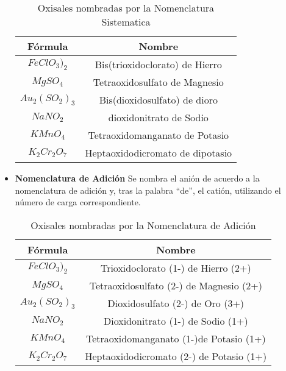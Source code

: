 \begin{itemize}
	\begin{table}[h!]
		\centering
		\begin{tabular}{c|c}
			Fórmula&Nombre \\ \hline
			$FeClO_3)_2$&Bis(trioxidoclorato) de Hierro\\
			$MgSO_4$&Tetraoxidosulfato de Magnesio\\
			$Au_2(SO_2)_3$&Bis(dioxidosulfato) de dioro\\
			$NaNO_2$&dioxidonitrato de Sodio\\
			$KMnO_4$&Tetraoxidomanganato de Potasio\\
			$K_2Cr_2O_7$&Heptaoxidodicromato de dipotasio\\ \hline
		\end{tabular}
		\caption{Oxisales nombradas por la Nomenclatura Sistematica}
	\end{table}
	\item\textbf{Nomenclatura de Adición} Se nombra el anión de acuerdo a la nomenclatura de adición y, tras la palabra “de”, el catión, utilizando el número de carga correspondiente.
	\begin{table}[h!]
		\centering
		\begin{tabular}{c|c}
			Fórmula&Nombre \\ \hline
			$FeClO_3)_2$&Trioxidoclorato (1-) de Hierro (2+)\\
			$MgSO_4$&Tetraoxidosulfato (2-) de Magnesio (2+)\\
			$Au_2(SO_2)_3$&Dioxidosulfato (2-) de Oro (3+)\\
			$NaNO_2$&Dioxidonitrato (1-) de Sodio (1+)\\
			$KMnO_4$&Tetraoxidomanganato (1-)de Potasio (1+)\\
			$K_2Cr_2O_7$&Heptaoxidodicromato (2-) de Potasio (1+)\\ \hline
		\end{tabular}
			\caption{Oxisales nombradas por la Nomenclatura de Adición}
	\end{table}
\end{itemize}
